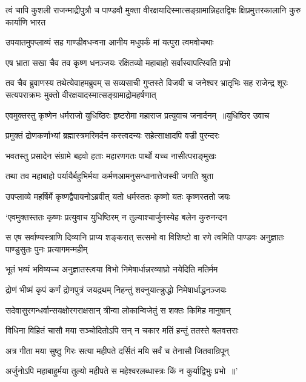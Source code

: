 \threelineshloka
{त्वं चापि कुशली राजन्माद्रीपुत्रौ च पाण्डवौ}
{मुक्ता वीरक्षयादिस्मात्सङ्ग्रामान्निहतद्विषः}
{क्षिप्रमुत्तरकालानि कुरु कार्याणि भारत}


\twolineshloka
{उपयातमुपप्लाव्यं सह गाण्डीवधन्वना}
{आनीय मधुपर्कं मां यत्पुरा त्वमवोचथाः}


\twolineshloka
{एष भ्राता सखा चैव तव कृष्ण धनञ्जयः}
{रक्षितव्यो महाबाहो सर्वास्वापत्स्विति प्रभो}


तव चैव ब्रुवाणस्य तथेत्येवाहमब्रुवम्
\threelineshloka
{स सव्यसाची गुप्तस्ते विजयी च जनेश्वर}
{भ्रातृभिः सह राजेन्द्र शूरः सत्यपराक्रमः}
{मुक्तो वीरक्षयादस्मात्सङ्ग्रामाद्रोमहर्षणात्}


\threelineshloka
{एवमुक्तस्तु कृष्णेन धर्मराजो युधिष्ठिरः}
{हृष्टरोमा महाराज प्रत्युवाच जनार्दनम् ॥युधिष्ठिर उवाच}
{}


\twolineshloka
{प्रमुक्तं द्रोणकर्णाभ्यां ब्रह्मास्त्रमरिमर्दन}
{कस्त्वदन्यः सहेत्साक्षादपि वज्री पुरन्दरः}


\twolineshloka
{भवतस्तु प्रसादेन संग्रामे बहवो हताः}
{महारणगतः पार्थो यच्च नासीत्पराङ्मुखः}


\twolineshloka
{तथा तव महाबाहो पर्यायैर्बहुभिर्मया}
{कर्मणआमनुसन्धानात्तेजस्वी जगति श्रुता}


\twolineshloka
{उपप्लाव्ये महर्षिर्मे कृष्णद्वैपायनोऽब्रवीत्}
{यतो धर्मस्ततः कृष्णो यतः कृष्णस्ततो जयः}


\twolineshloka
{`एवमुक्तस्ततः कृष्णः प्रत्युवाच युधिष्ठिरम्}
{न तुल्याश्चार्जुनस्येह बलेन कुरुनन्दन}


\threelineshloka
{स एष सर्वाण्यस्त्राणि दिव्यानि प्राप्य शङ्करात्}
{सत्समो वा विशिष्टो वा रणे त्वमिति पाण्डवः}
{अनुज्ञातः पाण्डुसुतः पुनः प्रत्यागमन्महीम्}


\twolineshloka
{भूतं भव्यं भविष्यच्च अनुज्ञातस्त्वया विभो}
{निमेषार्धान्नरव्याघ्रो नयेदिति मतिर्मम}


\twolineshloka
{द्रोणं भीष्मं कृपं कर्णं द्रोणपुत्रं जयद्रथम्}
{निहन्तुं शक्नुयात्क्रुद्धो निमेषार्धाद्धनञ्जयः}


\twolineshloka
{सदेवासुरगन्धर्वान्सयक्षोरगराक्षसान्}
{त्रीन्वा लोकान्विजेतुं स शक्तः किमिह मानुषान्}


\twolineshloka
{विधिना विहितं चासौ मया सञ्चोदितोऽपि सन्}
{न चकार मतिं हन्तुं ततस्ते बलवत्तराः}


\twolineshloka
{अत्र गीता मया सुष्ठु गिरः सत्या महीपते}
{दर्सितं मयि सर्वं च तेनासौ जितवान्रिपून्}


\twolineshloka
{अर्जुनोऽपि महाबाहुर्मया तुल्यो महीपते}
{स महेश्वरलब्धास्त्रः किं न कुर्याद्विभुः प्रभो ॥'}


